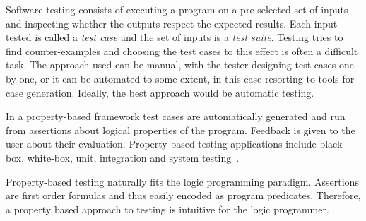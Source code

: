 Software testing consists of executing a program on
a pre-selected set of inputs and inspecting whether the outputs
respect the expected results.
%
Each input tested is called a \emph{test case} and the set of inputs is
a \emph{test suite}.
%
Testing tries to find counter-examples
%
and choosing 
the test cases %
to this effect
is often a difficult
task.
%
The approach used can be  manual, with the tester designing test cases
one by one, or it can be automated to some extent, in this case
resorting to tools for case generation.
%
Ideally, the best approach would be automatic testing.
%


In a property-based framework test cases are automatically generated and run
from assertions about logical properties of the program.
%
Feedback is given to the user about their
evaluation.
%
Property-based testing applications include
black-box, white-box, unit, integration and system testing~\cite{Claessen-ranking-prog-blackbox,Claessen-find-race-cond-erl,Boberg-model-based-testing-erl}.




Property-based testing naturally fits the logic programming paradigm. 
%
%
%
Assertions are first order formulas and thus easily encoded as program predicates.
%
Therefore, a property based approach to testing is intuitive for the
logic programmer.



